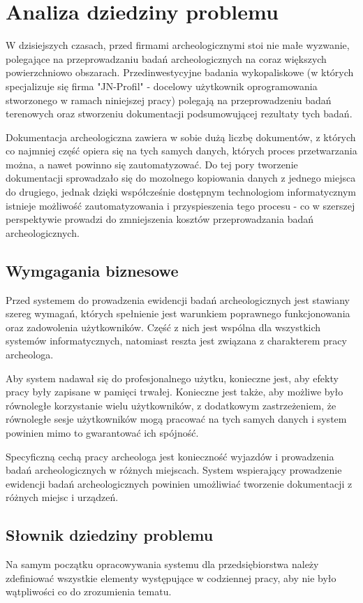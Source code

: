 \chapter{Analiza dziedziny problemu}
W dzisiejszych czasach, przed firmami archeologicznymi stoi nie małe wyzwanie, polegające na przeprowadzaniu badań archeologicznych na coraz większych powierzchniowo obszarach. Przedinwestycyjne badania wykopaliskowe (w których specjalizuje się firma "JN-Profil" - docelowy użytkownik oprogramowania stworzonego w ramach niniejszej pracy) polegają na przeprowadzeniu badań terenowych oraz stworzeniu dokumentacji podsumowującej rezultaty tych badań.

Dokumentacja archeologiczna zawiera w sobie dużą liczbę dokumentów, z których co najmniej część opiera się na tych samych danych, których proces przetwarzania można, a nawet powinno się zautomatyzować. Do tej pory tworzenie dokumentacji sprowadzało się do mozolnego kopiowania danych z jednego miejsca do drugiego, jednak dzięki współcześnie dostępnym technologiom informatycznym istnieje możliwość zautomatyzowania i przyspieszenia tego procesu - co w szerszej perspektywie prowadzi do zmniejszenia kosztów przeprowadzania badań archeologicznych.

\section{Wymgagania biznesowe}
Przed systemem do prowadzenia ewidencji badań archeologicznych jest stawiany szereg wymagań, których spełnienie jest warunkiem poprawnego funkcjonowania oraz zadowolenia użytkowników. Część z nich jest wspólna dla wszystkich systemów informatycznych, natomiast reszta jest związana z charakterem pracy archeologa.

Aby system nadawał się do profesjonalnego użytku, konieczne jest, aby efekty pracy były zapisane w pamięci trwałej. Konieczne jest także, aby możliwe było równoległe korzystanie wielu użytkowników, z dodatkowym zastrzeżeniem, że równoległe sesje użytkowników mogą pracować na tych samych danych i system powinien mimo to gwarantować ich spójność.

Specyficzną cechą pracy archeologa jest konieczność wyjazdów i prowadzenia badań archeologicznych w różnych miejscach. System wspierający prowadzenie ewidencji badań archeologicznych powinien umożliwiać tworzenie dokumentacji z różnych miejsc i urządzeń. 
\newpage
\section{Słownik dziedziny problemu}
Na samym początku opracowywania systemu dla przedsiębiorstwa należy zdefiniować wszystkie elementy występujące w codziennej pracy, aby nie było wątpliwości co do zrozumienia tematu. 

